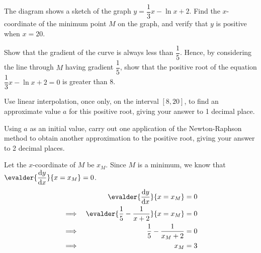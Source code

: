 \documentclass{echw}
\begin{document}
    \problem{}
        \begin{center}
        \end{center}

        The diagram shows a sketch of the graph $y = \dfrac13 x - \ln{x+2}$. Find the $x$-coordinate of the minimum point $M$ on the graph, and verify that $y$ is positive when $x = 20$.

        Show that the gradient of the curve is always less than $\dfrac15$. Hence, by considering the line through $M$ having gradient $\dfrac15$, show that the positive root of the equation $\dfrac13 x - \ln{x+2} = 0$ is greater than 8.

        Use linear interpolation, once only, on the interval $[8, 20]$, to find an approximate value $a$ for this positive root, giving your answer to 1 decimal place.

        Using $a$ as an initial value, carry out one application of the Newton-Raphson method to obtain another approximation to the positive root, giving your answer to 2 decimal places.

    \solution
        Let the $x$-coordinate of $M$ be $x_M$. Since $M$ is a minimum, we know that $\evalder{\der{y}{x}}{x = x_M} = 0$.        
        \begin{alignat*}{2}
            && \evalder{\der{y}{x}}{x = x_M} &= 0\\
            \implies&& \evalder{\dfrac15 - \dfrac1{x+2}}{x = x_M} &= 0 \\
            \implies&& \dfrac15 - \dfrac1{x_M+2} &= 0 \\
            \implies&& x_M &= 3
        \end{alignat*}
\end{document}
